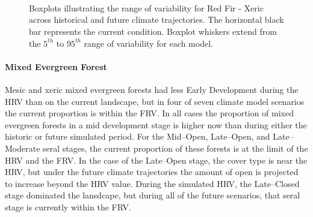 \begin{figure}[htbp]
  \centering
   \\
   \\
    \\
    \caption{Boxplots illustrating the range of variability for Red Fir - Xeric across historical and future climate trajectories. The horizontal black bar represents the current condition. Boxplot whiskers extend from the $5^{th}$ to $95^{th}$ range of variability for each model. }
  \label{fig:covcond_rfrx_frv}
\end{figure} %

\paragraph*{Mixed Evergreen Forest} Mesic and xeric mixed evergreen forests had less Early Development during the HRV than on the current landscape, but in four of seven climate model scenarios the current proportion is within the FRV. In all cases the proportion of mixed evergreen forests in a mid development stage is higher now than during either the historic or future simulated period. For the Mid--Open, Late--Open, and Late--Moderate seral stages, the current proportion of these forests is at the limit of the HRV and the FRV. In the case of the Late--Open stage, the cover type is near the HRV, but under the future climate trajectories the amount of open is projected to increase beyond the HRV value. During the simulated HRV, the Late--Closed stage dominated the lansdcape, but during all of the future scenarios, that seral stage is currently within the FRV. 

